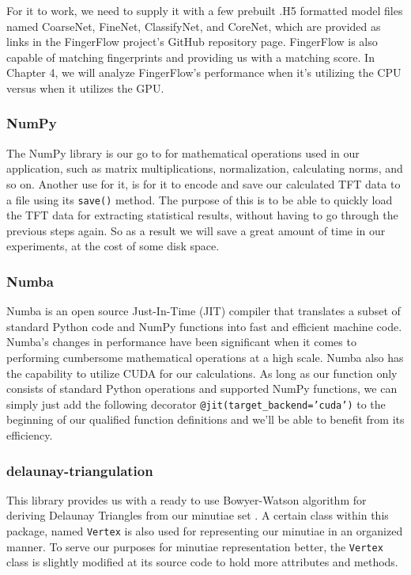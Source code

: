 \documentclass[fyp]{socreport}
\begin{document}
For it to work, we need to supply it with a few prebuilt .H5 formatted model files named CoarseNet, FineNet, ClassifyNet, and CoreNet, which are provided as links in the FingerFlow project's GitHub repository page. FingerFlow is also capable of matching fingerprints and providing us with a matching score. In Chapter 4, we will analyze FingerFlow's performance when it's utilizing the CPU versus when it utilizes the GPU.

\subsubsection{NumPy}
The NumPy library is our go to for mathematical operations used in our application, such as matrix multiplications, normalization, calculating norms, and so on. Another use for it, is for it to encode and save our calculated TFT data to a file using its \texttt{save()} method. The purpose of this is to be able to quickly load the TFT data for extracting statistical results, without having to go through the previous steps again. So as a result we will save a great amount of time in our experiments, at the cost of some disk space.

\subsubsection{Numba}
Numba is an open source Just-In-Time (JIT) compiler that translates a subset of standard Python code and NumPy functions into fast and efficient machine code. Numba's changes in performance have been significant when it comes to performing cumbersome mathematical operations at a high scale. Numba also has the capability to utilize CUDA for our calculations. As long as our function only consists of standard Python operations and supported NumPy functions, we can simply just add the following decorator \texttt{@jit(target\_backend='cuda')} to the beginning of our qualified function definitions and we'll be able to benefit from its efficiency.

\subsubsection{delaunay-triangulation}
This library provides us with a ready to use Bowyer-Watson algorithm for deriving Delaunay Triangles from our minutiae set \cite{delgit}. A certain class within this package, named \texttt{Vertex} is also used for representing our minutiae in an organized manner. To serve our purposes for minutiae representation better, the \texttt{Vertex} class is slightly modified at its source code to hold more attributes and methods.
\end{document}
